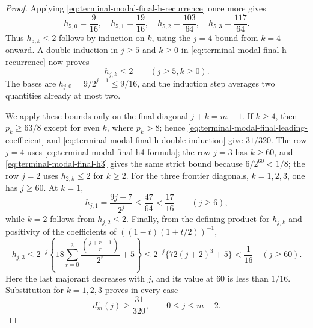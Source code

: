 \begin{proof}
Applying \eqref{eq:terminal-modal-final-h-recurrence} once more gives
\begin{equation}
 h_{5,0}=\frac9{16},\quad h_{5,1}=\frac{19}{16},\quad
 h_{5,2}=\frac{103}{64},\quad h_{5,3}=\frac{117}{64}.
\end{equation}
Thus $h_{5,k}\le2$ follows by induction on $k$, using the $j=4$ bound from
$k=4$ onward.  A double induction in $j\ge5$ and $k\ge0$ in
\eqref{eq:terminal-modal-final-h-recurrence} now proves
\begin{equation}
 h_{j,k}\le2\qquad(j\ge5, k\ge0).
 \label{eq:terminal-modal-final-h-double-induction}
\end{equation}
The bases are $h_{j,0}=9/2^{j-1}\le9/16$, and the induction step averages
two quantities already at most two.

We apply these bounds only on the final diagonal $j+k=m-1$.  If $k\ge4$,
then $p_k\ge63/8$ except for even $k$, where $p_k>8$; hence
\eqref{eq:terminal-modal-final-leading-coefficient} and
\eqref{eq:terminal-modal-final-h-double-induction} give $31/320$.  The row
$j=4$ uses \eqref{eq:terminal-modal-final-h4-formula}; the row $j=3$ has
$k\ge60$, and \eqref{eq:terminal-modal-final-h3} gives the same strict
bound because $6/2^{60}<1/8$; the row $j=2$ uses $h_{2,k}\le2$ for
$k\ge2$.  For the three frontier diagonals, $k=1,2,3$, one has
$j\ge60$.  At $k=1$,
\begin{equation}
 h_{j,1}=\frac{9j-7}{2^j}\le\frac{47}{64}<\frac{17}{16}
 \qquad(j\ge6),
\end{equation}
while $k=2$ follows from $h_{j,2}\le2$.  Finally, from the defining product
for $h_{j,k}$ and positivity of the coefficients of
$((1-t)(1+t/2))^{-1}$,
\begin{equation}
 h_{j,3}
 \le2^{-j}\left\{18\sum_{r=0}^3
 \frac{\binom{j+r-1}{r}}{2^r}+5\right\}
 \le2^{-j}\{72(j+2)^3+5\}<\frac1{16}
 \quad(j\ge60).
\end{equation}
Here the last majorant decreases with $j$, and its value at $60$ is less
than $1/16$.  Substitution for $k=1,2,3$ proves in every case
\begin{equation}
 d_m^\circ(j)\ge\frac{31}{320},\qquad0\le j\le m-2.
 \label{eq:terminal-modal-final-leading-margin}
\end{equation}


\end{proof}
